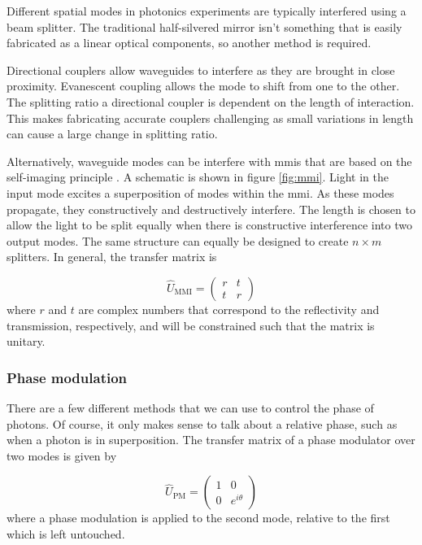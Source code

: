 Different spatial modes in photonics experiments are typically interfered using a beam splitter. The traditional half-silvered mirror isn't something that is easily fabricated as a linear optical components, so another method is required.

Directional couplers allow waveguides to interfere as they are brought in close proximity. Evanescent coupling allows the mode to shift from one to the other. The splitting ratio a directional coupler is dependent on the length of interaction. This makes fabricating accurate couplers challenging as small variations in length can cause a large change in splitting ratio.

Alternatively, waveguide modes can be interfere with \acp{mmi} that are based on the self-imaging principle \cite{soldano1995optical}. A schematic is shown in figure \ref{fig:mmi}. Light in the input mode excites a superposition of modes within the \ac{mmi}. As these modes propagate, they constructively and destructively interfere. The length is chosen to allow the light to be split equally when there is constructive interference into two output modes. The same structure can equally be designed to create $n\times m$ splitters. In general, the transfer matrix is

\begin{equation}
	\hat{U}_\mathrm{MMI} = \left(
	\begin{matrix}
	r & t\\
	t & r
	\end{matrix}
	\right)
\end{equation}
where $r$ and $t$ are complex numbers that correspond to the reflectivity and transmission, respectively, and will be constrained such that the matrix is unitary.

\subsubsection*{Phase modulation}

There are a few different methods that we can use to control the phase of photons. Of course, it only makes sense to talk about a relative phase, such as when a photon is in superposition. The transfer matrix of a phase modulator over two modes is given by

\begin{equation}
	\hat{U}_\mathrm{PM} = \left(
	\begin{matrix}
	1 & 0\\
	0 & e^{i\theta}
	\end{matrix}
	\right)
\end{equation}
where a phase modulation is applied to the second mode, relative to the first which is left untouched.

